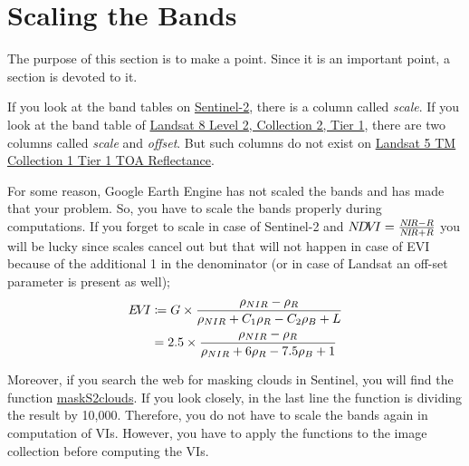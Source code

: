 \section{Scaling the Bands}
\label{sec:Scaling-the-Bands}
The purpose of this section is to make a point.
Since it is an important point, a section is devoted to it.

If you look at the band tables on \href{https://developers.google.com/earth-engine/datasets/catalog/COPERNICUS_S2#bands}{Sentinel-2},
there is a column called \emph{scale}. If you look at the band
table of \href{https://developers.google.com/earth-engine/datasets/catalog/LANDSAT_LC08_C02_T1_L2#bands}{Landsat 8 Level 2, Collection 2, Tier 1}, there are two columns called \emph{scale} and \emph{offset}. But such columns do not exist on 
\href{https://developers.google.com/earth-engine/datasets/catalog/LANDSAT_LT05_C01_T1_TOA#bands}{Landsat 5 TM Collection 1 Tier 1 TOA Reflectance}.

For some reason, Google Earth Engine has not scaled the bands
and has made that your problem. So, you have to scale the bands
properly during computations. If you forget to scale in case of Sentinel-2 and 
$N\!D\!V\!I = \frac{N\!I\!R - R}{N\!I\!R + R}$ you will be lucky since scales
cancel out but that will not happen in case of EVI because 
of the additional 1 in the denominator 
(or in case of Landsat an off-set parameter is present as well);
\begin{gather}\label{eq:EVIeq} %
\begin{aligned}
\EVI &\coloneqq  G \times \frac{\rho_{NIR} - \rho_R}{\rho_{NIR} + C_1 \rho_R - C_2 \rho_B + L} \\ 
   &= 2.5 \times \frac{\rho_{NIR} - \rho_R}{\rho_{NIR} + 6 \rho_R - 7.5 \rho_B + 1} \\ 
\end{aligned}
\end{gather} 

Moreover, if you search the web for masking clouds in Sentinel,
you will find the function \href{https://developers.google.com/earth-engine/datasets/catalog/COPERNICUS_S2}{maskS2clouds}. 
If you look closely, in the last line the function is dividing 
the result by 10,000. Therefore, you do not have to scale
the bands again in computation of VIs. However,
you have to apply the  functions
to the image collection before computing the VIs.


